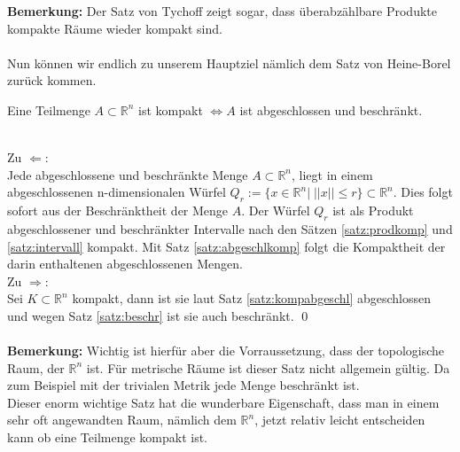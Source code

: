\textbf{Bemerkung:} Der Satz von Tychoff zeigt sogar, dass überabzählbare Produkte kompakte Räume wieder kompakt sind. \\
%
\\
Nun können wir endlich zu unserem Hauptziel nämlich dem Satz von Heine-Borel zurück kommen.
%	
\begin{Satz}
	Eine Teilmenge  \( A \subset \mathbb{R}^n \) ist kompakt \(\Leftrightarrow A \) ist abgeschlossen und beschränkt.
\end{Satz}
%
 \\
	Zu \(\Leftarrow \): \\
	Jede abgeschlossene und beschränkte Menge \(A \subset\mathbb{R}^n \), liegt in einem abgeschlossenen n-dimensionalen Würfel \( Q_r:= \{ x \in \mathbb{R}^n | \; ||x|| \leq r\} \subset \mathbb{R}^n \). 
	Dies folgt sofort aus der Beschränktheit der Menge \(A\). Der Würfel \(Q_r\) ist als Produkt abgeschlossener und beschränkter Intervalle nach den Sätzen \ref{satz:prodkomp} und \ref{satz:intervall} kompakt.
	Mit Satz \ref{satz:abgeschlkomp} folgt die Kompaktheit der darin enthaltenen abgeschlossenen Mengen.
	\\
	Zu \(\Rightarrow \): \\
	Sei \( K \subset \mathbb{R}^n \) kompakt, dann ist sie laut Satz \ref{satz:kompabgeschl} abgeschlossen und wegen Satz \ref{satz:beschr} ist sie auch beschränkt.
\qed \\
%
\\
\textbf{Bemerkung:} Wichtig ist hierfür aber die Vorraussetzung, dass der topologische Raum, der \(\mathbb{R}^n \) ist. Für metrische Räume ist dieser Satz nicht allgemein gültig. 
Da zum Beispiel mit der trivialen Metrik jede Menge beschränkt ist.
\\
%
Dieser enorm wichtige Satz hat die wunderbare Eigenschaft, dass man in einem sehr oft angewandten Raum, nämlich dem \(\mathbb{R}^n \), 
jetzt relativ leicht entscheiden kann ob eine Teilmenge kompakt ist. 

